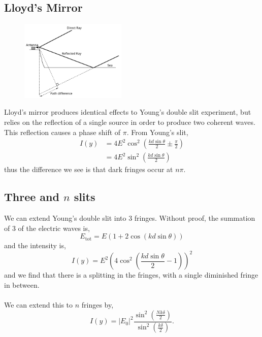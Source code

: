 \documentclass{book}
\begin{document}
{\subsection{Lloyd's Mirror}
\begin{figure}[h]
	\centering
	\includegraphics[width=0.45\textwidth]{lloyd.png}
	\caption{}
\end{figure}
Lloyd's mirror produces identical effects to Young's double slit experiment, but relies on the reflection of a single source in order to produce two coherent waves. This reflection causes a phase shift of $\pi$. From Young's slit,
\begin{equation}
	\begin{split}
		I(y) & = 4E^2\cos^2\left(\frac{kd\sin\theta}{2}\pm \frac{\pi}{2}\right) \\
		& = 4E^2\sin^2\left(\frac{kd\sin\theta}{2}\right)
	\end{split}
\end{equation}
thus the difference we see is that dark fringes occur at $n\pi$. 
\subsection{Three and $n$ slits}
We can extend Young's double slit into 3 fringes. Without proof, the summation of 3 of the electric waves is,
\begin{equation}
	E_{\text{tot}} = E(1+2\cos(kd\sin\theta))
\end{equation}
and the intensity is,
\begin{equation}
	I(y) = E^2\left(4\cos^2\left(\frac{kd\sin\theta}{2} - 1\right)\right)^2
\end{equation}
and we find that there is a splitting in the fringes, with a single diminished fringe in between. 
\\\\
We can extend this to $n$ fringes by,
\begin{equation}
	I(y) = |E_0|^2\frac{\sin^2\left(\frac{Nk\delta}{2}\right)}{\sin^2\left(\frac{k\delta}{2}\right)}.
\end{equation}
}
\end{document}
